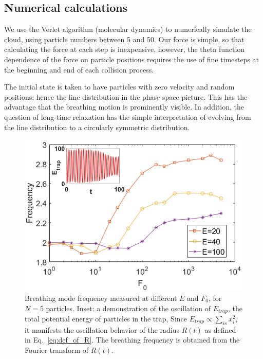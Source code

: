\documentclass[aps,preprintnumbers,onecolumn,amsmath,amssymb,floatfix,pra]{revtex4-1}
\begin{document}
\subsection{Numerical calculations}

We use the Verlet algorithm (molecular dynamics) to numerically simulate the cloud, using particle
numbers between 5 and 50.  Our force is simple, so that calculating the force at each step is
inexpensive, however, the theta function dependence of the force on particle positions requires the
use of fine timesteps at the beginning and end of each collision process.

The initial state is taken to have particles with zero velocity and random positions; hence the line
distribution in the phase space picture.  This has the advantage that the breathing motion is
prominently visible.  In addition, the question of long-time relaxation has the simple
interpretation of evolving from the line distribution to a circularly symmetric distribution.





\begin{figure}[tbp]
\center
\includegraphics[scale=0.32]{ZhiyuPictures/freq_scanF_differentE_log_2_with_oscillation_demo.png}
\caption{Breathing mode frequency measured at different $E$ and $F_0$, for $N=5$ particles. Inset: a
  demonstration of the oscillation of $E_{trap}$, the total potential energy of particles in the
  trap, Since $E_{trap}\propto \sum_{is}{x_i^2}$, it manifests the oscillation behavior of the
  radius $R(t)$ as defined in Eq.~\ref{eq:def_of_R}.  The breathing frequency is obtained from the
  Fourier transform of $R(t)$.}
\label{fig:Breathingfrequency1}
\end{figure}
\end{document}
